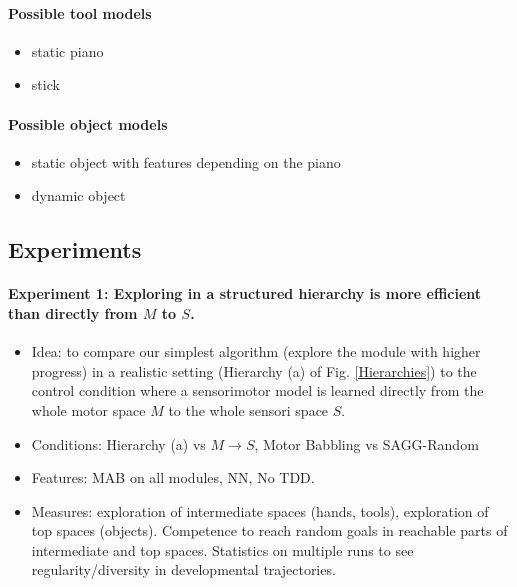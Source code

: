 \documentclass[conference]{include/IEEEtran}
\begin{document}
		\paragraph{Possible tool models}
		\begin{itemize}
			\item static piano
			\item stick 
		\end{itemize}
		
		\paragraph{Possible object models}
		\begin{itemize}
			\item static object with features depending on the piano
			\item dynamic object
		\end{itemize}
		
	
	

	\subsection{Experiments}

			\paragraph{Experiment 1: Exploring in a structured hierarchy is more efficient than directly from $M$ to $S$.}				
			\begin{itemize}
				\item Idea: to compare our simplest algorithm (explore the module with higher progress) in a realistic setting (Hierarchy (a) of Fig. \ref{Hierarchies}) to the control condition where a sensorimotor model is learned
						directly from the whole motor space $M$ to the whole sensori space $S$.
				
				\item Conditions: Hierarchy (a) vs $M \rightarrow S$, Motor Babbling vs SAGG-Random
				
				\item Features: MAB on all modules, NN, No TDD.
				
				\item Measures: exploration of intermediate spaces (hands, tools), exploration of top spaces (objects). Competence to reach random goals in reachable parts of intermediate and top spaces. 
						Statistics on multiple runs to see regularity/diversity in developmental trajectories.
			\end{itemize}
			
\end{document}
